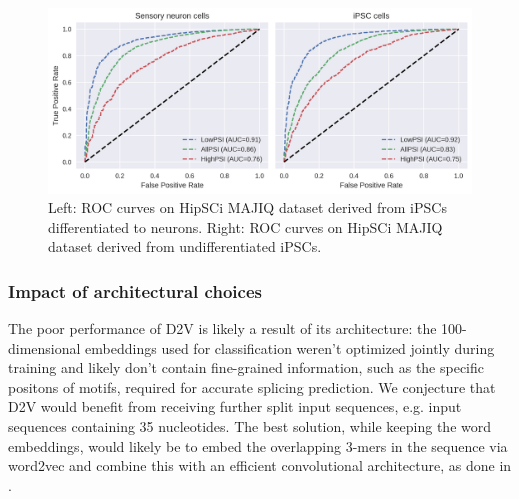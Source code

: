 


\begin{figure}
	\centering\includegraphics[width=1\textwidth]{../visualizations/ch5-results/majiq_neuron_ipsc_cross_psi_roc_auc_comparison.png} 
	\caption{Left: ROC curves on HipSCi MAJIQ dataset derived from iPSCs differentiated to neurons. Right: ROC curves on HipSCi MAJIQ dataset derived from undifferentiated iPSCs. }
	\label{fig:majiq_rocs_low_high}
\end{figure}




\subsubsection{Impact of architectural choices} \label{subsubsec:majiq_architectural_choices}
The poor performance of D2V is likely a result of its architecture: the 100-dimensional embeddings used for classification weren't optimized jointly during training and likely don't contain fine-grained information, such as the specific positons of motifs, required for accurate splicing prediction. We conjecture that D2V would benefit from receiving further split input sequences, e.g. input sequences containing 35 nucleotides. The best solution, while keeping the word embeddings, would likely be to embed the overlapping 3-mers in the sequence via word2vec and combine this with an efficient convolutional architecture, as done in \cite{d2vsplicing}.



